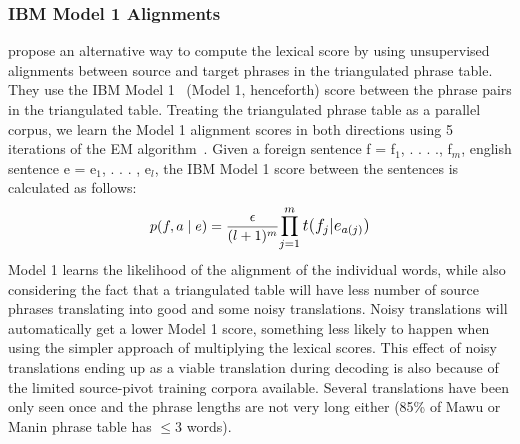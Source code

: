 \documentclass[11pt]{article}
\begin{document}
\subsubsection{IBM Model 1 Alignments} \label{sec:model1} \cite{Cohn:07} propose an alternative way to compute the lexical score by using unsupervised alignments between source and target phrases in the triangulated phrase table. They use the IBM Model 1~\cite{Brown:1993} (Model 1, henceforth) score between the phrase pairs in the triangulated table. Treating the triangulated phrase table as a parallel corpus, we learn the Model 1 alignment scores in both directions using 5 iterations of the EM algorithm~\cite{Dempster:77}. 
Given a foreign sentence f = f$_{1}$, . . . ., f$_{m}$, english sentence e = e$_{1}$, . . . , e$_{l}$, the IBM Model 1 score between the sentences is calculated as follows: 
		\begin{equation}
			p(f, a \mid e) = \frac{\epsilon}{(l+1)^m}\mathlarger{\prod\limits_{j=1}^{m}t(f_{j}|e_{a(j)})}
		\end{equation}
%
Model 1 learns the likelihood of the alignment of the individual words, while also considering the fact that a triangulated table will have less number of source phrases translating into good and some noisy translations. Noisy translations will automatically get a lower Model 1 score, something less likely to happen when using the simpler approach of multiplying the lexical scores. This effect of noisy translations ending up as a viable translation during decoding is also because of the limited source-pivot training corpora available. Several translations have been only seen once and the phrase lengths are not very long either (85\% of Mawu or Manin phrase table has $\leq 3$ words).
	\begin{comment}
	The connectivity features in section~\ref{sec:strength} assign a phrase-level score to a given translation pair. The score does not reflect the actual alignments between the word pairs.  A Model 1 score is also used in~\cite{Cohn:07} in the absence of word alignments. They report a BLEU score improvement of 2 points over the standard feature set when using the Model 1 score, but we observe a different pattern altogether across all the four resource-poor languages~\ref{sec:results}. 
	\end{comment}


\end{document}
